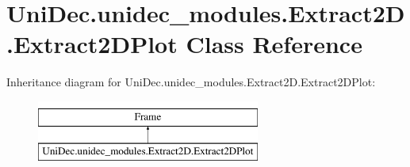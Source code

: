 \hypertarget{class_uni_dec_1_1unidec__modules_1_1_extract2_d_1_1_extract2_d_plot}{}\section{Uni\+Dec.\+unidec\+\_\+modules.\+Extract2\+D.\+Extract2\+D\+Plot Class Reference}
\label{class_uni_dec_1_1unidec__modules_1_1_extract2_d_1_1_extract2_d_plot}
Inheritance diagram for Uni\+Dec.\+unidec\+\_\+modules.\+Extract2\+D.\+Extract2\+D\+Plot\+:\begin{figure}[H]
\begin{center}
\leavevmode
\includegraphics[height=2.000000cm]{class_uni_dec_1_1unidec__modules_1_1_extract2_d_1_1_extract2_d_plot}
\end{center}
\end{figure}
